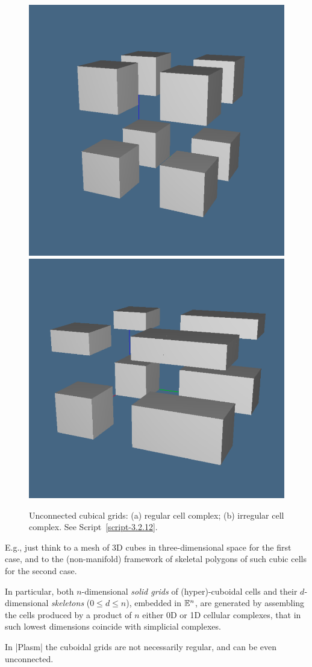 \begin{figure}[] %
   \includegraphics[height=0.5\linewidth,width=0.5\linewidth]{chapter-03/figs/cubic01}%
   \includegraphics[height=0.5\linewidth,width=0.5\linewidth]{chapter-03/figs/cubic02}%
   \caption{Unconnected cubical grids: (a) regular cell complex; (b) irregular cell complex. See Script~\ref{script-3.2.12}.}
   \label{fig:3:cubics}
\end{figure}


E.g., just think to a mesh of 3D cubes in three-dimensional space for the first case, and to the (non-manifold) framework of skeletal polygons of such cubic cells for the second case.

In particular,  both $n$-dimensional \emph{solid grids} of (hyper)-cuboidal cells and their  $d$-dimensional \emph{skeletons} ($0\leq d\leq n$), embedded in $\mathbb{E}^n$, are generated by assembling the cells produced by a product of $n$ either 0D or 1D cellular complexes, that in such lowest dimensions coincide with {simplicial complexes}. 

In |Plasm| the cuboidal grids are not necessarily regular, and can be even unconnected. 

